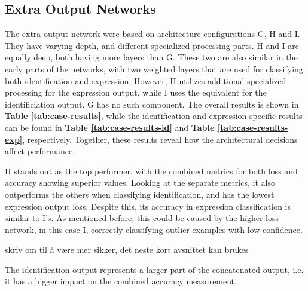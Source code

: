 \subsection{Extra Output Networks}

The extra output network were based on architecture configurations G, H and I. They have varying depth, and different specialized processing parts. H and I are equally deep, both having more layers than G. These two are also similar in the early parts of the networks, with two weighted layers that are used for classifying both identification and expression. However, H utilizes additional specialized processing for the expression output, while I uses the equivalent for the identificiation output. G has no such component. The overall results is shown in \textbf{Table \ref{tab:case-results}}, while the identification and expression specific results can be found in \textbf{Table \ref{tab:case-results-id}} and \textbf{Table \ref{tab:case-results-exp}}, respectively. Together, these results reveal how the architectural decisions affect performance. 


H stands out as the top performer, with the combined metrics for both loss and accuracy showing superior values. Looking at the separate metrics, it also outperforms the others when classifying identification, and has the lowest expression output loss. Despite this, its accuracy in expression classification is similar to I's. As mentioned before, this could be caused by the higher loss network, in this case I, correctly classifying outlier examples with low confidence.


skriv om til å være mer sikker, det neste kort avsnittet kan brukes


The identification output represents a larger part of the concatenated output, i.e. it has a bigger impact on the combined accuracy measurement.

